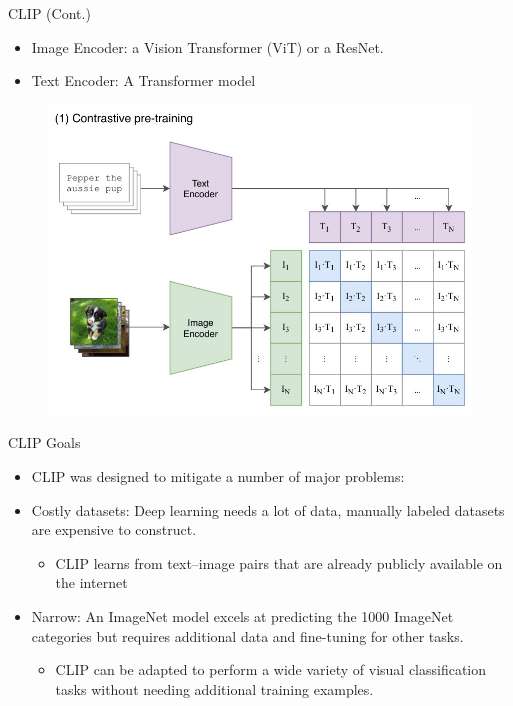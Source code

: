 \documentclass[serif, aspectratio=169]{beamer}
\begin{document}
\begin{frame}{CLIP (Cont.)}
\begin{itemize}
\item Image Encoder: a Vision Transformer (ViT) or a ResNet.
\item Text Encoder: A Transformer model 
\end{itemize}
\begin{figure}[hb]
        \begin{center}
            \includegraphics[keepaspectratio, scale=0.5]{pic/clip-overview.jpg}
        \end{center}
    \end{figure}
\end{frame}


\begin{frame}{CLIP Goals}
\begin{itemize}
\item CLIP was designed to mitigate a number of major problems:
\item Costly datasets: Deep learning needs a lot of data, manually labeled datasets are expensive to construct.
\begin{itemize}
\item CLIP learns from text–image pairs that are already publicly available on the internet
\end{itemize}
\item Narrow: An ImageNet model excels at predicting the 1000 ImageNet categories but requires additional data and fine-tuning for other tasks. 

\begin{itemize}
\item CLIP can be adapted to perform a wide variety of visual classification tasks without needing additional training examples. 
\end{itemize}
\end{itemize}

\end{frame}
\end{document}
